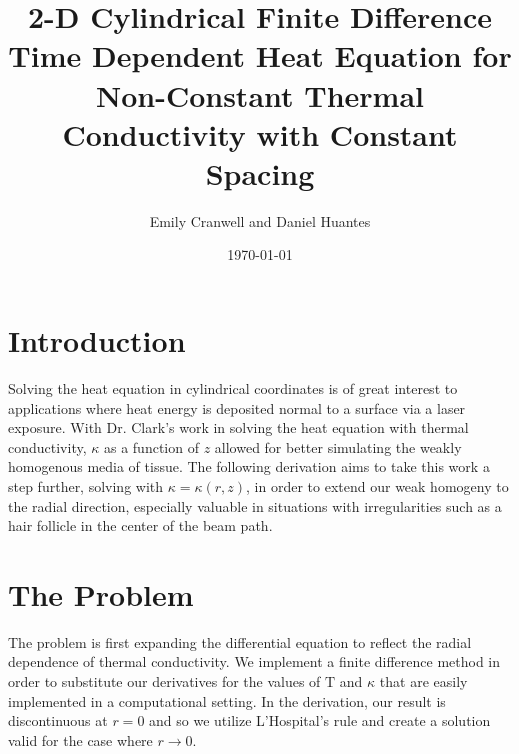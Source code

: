 \documentclass[12pt]{article}
\begin{document}
	\small
	\title{2-D Cylindrical Finite Difference Time Dependent Heat Equation for Non-Constant Thermal Conductivity with Constant Spacing}  
	\normalsize
	\author{Emily Cranwell and Daniel Huantes}
	\date{\today} 
	\maketitle
		\section{Introduction}
		  Solving the heat equation in cylindrical coordinates is of great interest to applications where heat energy is deposited normal to a surface via a laser exposure. With Dr. Clark's work in solving the heat equation with thermal conductivity, $\kappa$ as a function of $z$ allowed for better simulating the weakly homogenous media of tissue. The following derivation aims to take this work a step further, solving with $\kappa = \kappa(r, z)$, in order to extend our weak homogeny to the radial direction, especially valuable in situations with irregularities such as a hair follicle in the center of the beam path.
		\section{The Problem}
		  The problem is first expanding the differential equation to reflect the radial dependence of thermal conductivity. We implement a finite difference method in order to substitute our derivatives for the values of $\mathrm{T}$ and $\kappa$ that are easily implemented in a computational setting. In the derivation, our result is discontinuous at $r = 0$ and so we utilize L'Hospital's rule and create a solution valid for the case where $r\rightarrow0$.
\end{document}
